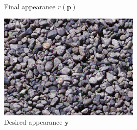 \begin{figure}[]
\begin{subfigure}{\textwidth}
\begin{subfigure}{0.78\textwidth}
\begin{subfigure}{0.32\textwidth}
            \end{subfigure}
            \caption*{Final appearance \(r(\bm{p})\)}
        \end{subfigure}

        \begin{subfigure}{0.2\textwidth}
            \centering
            \includegraphics[width=\textwidth]{images/04-experiment02/sofa/pebbles/target.jpg}
            \caption*{Desired appearance \(\bm{y}\)}
        \end{subfigure}
        \hfill
        \begin{subfigure}{0.78\textwidth}
            \centering
            \begin{subfigure}{0.32\textwidth}
                \centering
\end{subfigure}
\end{subfigure}
\end{subfigure}
\end{figure}
